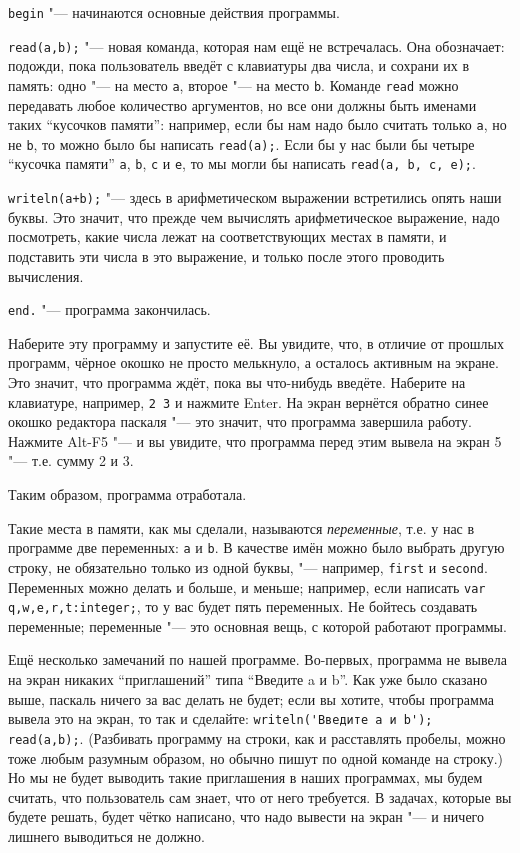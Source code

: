 \verb`begin` "--- начинаются основные действия программы.

\verb`read(a,b);` "--- новая команда, которая нам ещё не встречалась. Она обозначает: подожди, пока 
пользователь введёт с клавиатуры два числа, и сохрани их в память: одно "--- на место \verb`a`, 
второе "--- на место \verb`b`. Команде \verb`read` можно передавать любое количество аргументов, но 
все они должны быть именами таких ``кусочков памяти'': например, если бы нам надо было считать только 
\verb`a`, но не \verb`b`, то можно было бы написать \verb`read(a);`. Если бы у нас были бы четыре 
``кусочка памяти'' \verb`a`, \verb`b`, \verb`c` и \verb`e`, то мы могли бы написать \verb`read(a, b, c, e);`.

\verb`writeln(a+b);` "--- здесь в арифметическом выражении встретились опять наши буквы. Это значит, что прежде чем вычислять арифметическое выражение, надо посмотреть, какие числа лежат на соответствующих местах в памяти, и подставить эти числа в это выражение, и только после этого проводить вычисления.

\verb`end.` "--- программа закончилась.

Наберите эту программу и запустите её. Вы увидите, что, в отличие от прошлых программ, чёрное окошко не просто мелькнуло, а осталось активным на экране. Это значит, что программа ждёт, пока вы что-нибудь введёте. Наберите на клавиатуре, например, \verb`2 3` и нажмите Enter. На экран вернётся обратно синее окошко редактора паскаля "--- это значит, что программа завершила работу. Нажмите Alt-F5 "--- и вы увидите, что программа перед этим вывела на экран 5 "--- т.е. сумму 2 и 3.

Таким образом, программа отработала.

Такие места в памяти, как мы сделали, называются \textit{переменные}, т.е. у нас в программе две 
переменных: \verb`a` и \verb`b`. В качестве имён можно было выбрать другую строку, не обязательно 
только из одной буквы, "--- например, \verb`first` и \verb`second`. Переменных можно делать и больше, и меньше; например, если написать 
\verb`var q,w,e,r,t:integer;`, то у вас будет пять переменных. Не бойтесь создавать переменные; 
переменные "--- это основная вещь, с которой работают программы.

Ещё несколько замечаний по нашей программе. Во-первых, программа не вывела на экран никаких 
``приглашений'' типа ``Введите a и b''. Как уже было сказано выше, паскаль ничего за вас делать не 
будет; если вы хотите, чтобы программа вывела это на экран, то так и сделайте: 
\verb`writeln('Введите a и b'); read(a,b);`. (Разбивать программу на строки, как и расставлять пробелы, можно 
тоже любым разумным образом, но обычно пишут по одной команде на строку.) Но мы не будет выводить 
такие приглашения в наших программах, мы будем считать, что пользователь сам знает, что от него 
требуется. В задачах, которые вы будете решать, будет чётко написано, что надо вывести на экран 
"--- и ничего лишнего выводиться не должно. 

